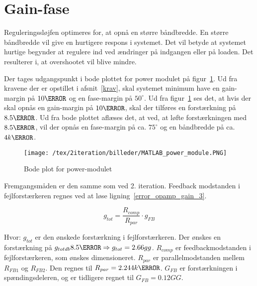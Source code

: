 

\section{Gain-fase}
Reguleringssløjfen optimeres for, at opnå en større båndbredde. En større båndbredde vil give en hurtigere respons i systemet. Det vil betyde at systemet hurtige begynder at regulere ind ved ændringer på indgangen eller på loaden. Det resulterer i, at overshootet vil blive mindre.  

Der tages udgangspunkt i bode plottet for power modulet på figur~\ref{fig:MATLAB_power_module}. Ud fra kravene der er opstillet i afsnit~\ref{krav}, skal systemet minimum have en gain-margin på $10\decibel$ og en fase-margin på $50^\circ$. Ud fra figur~\ref{fig:MATLAB_power_module} ses det, at hvis der skal opnås en gain-margin på $10\decibel$, skal der tilføres en forstærkning på $8.5\decibel$. Ud fra bode plottet aflæses det, at ved, at løfte forstærkningen med $8.5\decibel$, vil der opnås en fase-margin på ca. $75^\circ$ og en båndbredde på ca. $4k\hertz$. 

\begin{figure}[H]
	\center
	\texttt{[image: /tex/2iteration/billeder/MATLAB\_power\_module.PNG]}
	\caption{Bode plot for power-modulet}
	\label{fig:MATLAB_power_module}
\end{figure}

\noindent Fremgangsmåden er den samme som ved 2. iteration. Feedback modstanden i fejlforstærkeren regnes ved at løse ligning~\ref{error_opamp_gain_3}.

\begin{equation} \label{error_opamp_gain_3}
g_{tot} = \frac{R_{comp}}{R_{par}} \cdot g_{FB}
\end{equation}

\noindent Hvor:
\newline \noindent $g_{tot}$ er den ønskede forstærkning i fejlforstærkeren. Der ønskes en forstærkning på $g_{totdb}8.5\decibel \Rightarrow g_{tot}=2.66gg$.
\newline \noindent $R_{comp}$ er feedbackmodstanden i fejlforstærkeren, som ønskes dimensioneret.
\newline \noindent $R_{par}$ er parallelmodstanden mellem $R_{FB1}$ og $R_{FB2}$. Den regnes til $R_{par}=2.244k\ohm$.
\newline \noindent $G_{FB}$ er forstærkningen i spændingsdeleren, og er tidligere regnet til $G_{FB}=0.12GG$.

